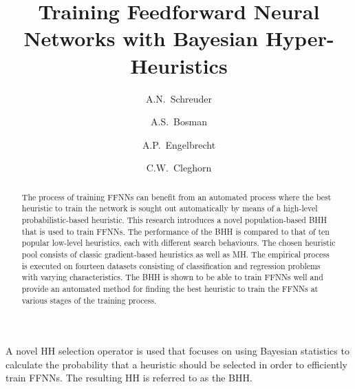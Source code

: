 \documentclass[preprint,review,12pt]{elsarticle}
\begin{document}
\begin{frontmatter}
	\title{Training Feedforward Neural Networks with Bayesian Hyper-Heuristics}





	\author[aff:tuks]{A.N.~Schreuder}
	\author[aff:tuks]{A.S.~Bosman}
	\author[aff:stellenbosch]{A.P.~Engelbrecht}
	\author[aff:wits]{C.W.~Cleghorn}


	\begin{abstract}
		The process of training \acfp{FFNN} can benefit from an automated process where the best heuristic to train the network is sought out automatically by means of a high-level probabilistic-based heuristic. This research introduces a novel population-based \acf{BHH} that is used to train \acfp{FFNN}. The performance of the \acs{BHH} is compared to that of ten popular low-level heuristics, each with different search behaviours. The chosen heuristic pool consists of classic gradient-based heuristics as well as \acf{MH}. The empirical process is executed on fourteen datasets consisting of classification and regression problems with varying characteristics. The \acs{BHH} is shown to be able to train \acp{FFNN} well and provide an automated method for finding the best heuristic to train the \acp{FFNN} at various stages of the training process.
	\end{abstract}

	\begin{highlights}
		\item A novel \acf{HH} selection operator is used that focuses on using Bayesian statistics to calculate the probability that a heuristic should be selected in order to efficiently train \acfp{FFNN}. The resulting \acs{HH} is referred to as the \acf{BHH}.


\end{highlights}
\end{frontmatter}
\end{document}
